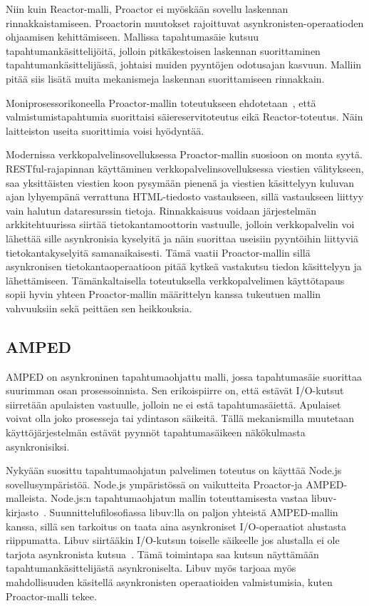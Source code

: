 \documentclass[finnish]{tktltiki2}%
\theoremstyle{definition}
\theoremstyle{remark}
\begin{document}
Niin kuin Reactor-malli, Proactor ei myöskään sovellu laskennan rinnakkaistamiseen.
Proactorin muutokset rajoittuvat asynkronisten-operaatioden ohjaamisen
kehittämiseen. Mallissa tapahtumasäie kutsuu tapahtumankäsittelijöitä, jolloin
pitkäkestoisen laskennan suorittaminen tapahtumankäsittelijässä, johtaisi
muiden pyyntöjen odotusajan kasvuun. Malliin pitää siis
lisätä muita mekanismeja laskennan suorittamiseen rinnakkain.

Moniprosessorikoneella Proactor-mallin toteutukseen
ehdotetaan~\cite{pyarali_proactor_1997}, että valmistumistapahtumia suorittaisi säiereservitoteutus
eikä Reactor-toteutus. Näin laitteiston useita suorittimia voisi hyödyntää.

Modernissa verkkopalvelinsovelluksessa Proactor-mallin suosioon on
monta syytä. RESTful-rajapinnan käyttäminen
verkkopalvelinsovelluksessa viestien välitykseen,
saa yksittäisten viestien koon pysymään pienenä ja viestien
käsittelyyn kuluvan ajan lyhyempänä verrattuna
HTML-tiedosto vastaukseen, sillä
vastaukseen liittyy vain halutun dataresurssin tietoja.
Rinnakkaisuus
voidaan järjestelmän arkkitehtuurissa siirtää tietokantamoottorin vastuulle,
jolloin verkkopalvelin voi lähettää sille asynkronisia kyselyitä
ja näin suorittaa useisiin pyyntöihin liittyviä tietokantakyselyitä
samanaikaisesti. Tämä vaatii Proactor-mallin sillä asynkronisen tietokantaoperaatioon
pitää kytkeä vastakutsu tiedon käsittelyyn ja lähettämiseen.
Tämänkaltaisella toteutuksella verkkopalvelimen käyttötapaus sopii
hyvin yhteen Proactor-mallin määrittelyn kanssa tukeutuen
mallin vahvuuksiin sekä peittäen sen heikkouksia.

\subsection{AMPED}

AMPED on asynkroninen tapahtumaohjattu malli, jossa
tapahtumasäie suorittaa suurimman osan prosessoinnista. 
Sen erikoispiirre on, että estävät I/O-kutsut
siirretään apulaisten vastuulle, jolloin
ne ei estä tapahtumasäiettä. Apulaiset voivat
olla joko prosesseja tai ydintason säikeitä.
Tällä mekanismilla muutetaan käyttöjärjestelmän
estävät pyynnöt tapahtumasäikeen näkökulmasta
asynkronisiksi.

Nykyään suosittu tapahtumaohjatun palvelimen toteutus on
käyttää Node.js sovellusympäristöä. Node.js ympäristössä
on vaikutteita Proactor-ja AMPED-malleista.
Node.js:n tapahtumaohjatun mallin toteuttamisesta vastaa
libuv-kirjasto~\cite{libuv_design_2019}. Suunnittelufilosofiassa
libuv:lla on paljon yhteistä AMPED-mallin kanssa, sillä
sen tarkoitus on taata aina asynkroniset I/O-operaatiot alustasta
riippumatta. Libuv siirtääkin I/O-kutsun toiselle säikeelle
jos alustalla ei ole tarjota asynkronista kutsua~\cite{libuv_design_2019}.
Tämä toimintapa saa kutsun näyttämään tapahtumankäsittelijästä
asynkroniselta. Libuv myös tarjoaa myös mahdollisuuden
käsitellä asynkronisten operaatioiden valmistumisia, kuten 
Proactor-malli tekee.
\end{document}
